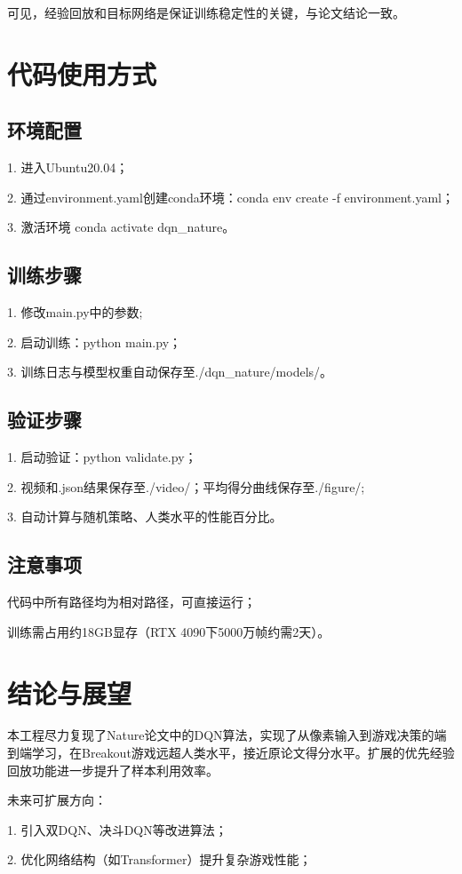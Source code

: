 \documentclass[conference]{IEEEtran}
\begin{document}
	可见，经验回放和目标网络是保证训练稳定性的关键，与论文结论一致。
	
	\section{代码使用方式}
	\subsection{环境配置}
	1. 进入Ubuntu20.04；
	
	2. 通过environment.yaml创建conda环境：conda env create -f environment.yaml；
	
	3. 激活环境 conda activate dqn\_nature。
	
	\subsection{训练步骤}
	1. 修改main.py中的参数;
	
	2. 启动训练：python main.py；
	
	3. 训练日志与模型权重自动保存至./dqn\_nature/models/。
	
	\subsection{验证步骤}
	1. 启动验证：python validate.py；
	
	2. 视频和.json结果保存至./video/；平均得分曲线保存至./figure/;
	
	3. 自动计算与随机策略、人类水平的性能百分比。
	
	\subsection{注意事项}
	代码中所有路径均为相对路径，可直接运行；
	
	训练需占用约18GB显存（RTX 4090下5000万帧约需2天）。
	
	\section{结论与展望}
	本工程尽力复现了Nature论文中的DQN算法，实现了从像素输入到游戏决策的端到端学习，在Breakout游戏远超人类水平，接近原论文得分水平。扩展的优先经验回放功能进一步提升了样本利用效率。
	
	未来可扩展方向：
	
	1. 引入双DQN、决斗DQN等改进算法；
	
	2. 优化网络结构（如Transformer）提升复杂游戏性能；
	
\end{document}
